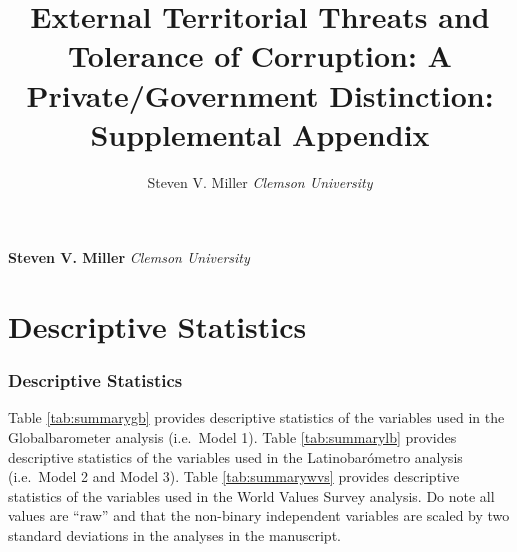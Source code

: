 \documentclass[11pt,]{article}
\title{External Territorial Threats and Tolerance of Corruption: A
Private/Government Distinction: Supplemental Appendix  }
\author{\Large Steven V. Miller\vspace{0.05in} \newline\normalsize\emph{Clemson University}  }
\date{}
\newcommand*{\authorfont}{\fontfamily{phv}\selectfont}
\begin{document}
	
%

{%
\setlength{\parindent}{0pt}
\thispagestyle{plain}
{\fontsize{18}{20}\selectfont\raggedright 
\maketitle  %

}

{
   \vskip 13.5pt\relax \normalsize\fontsize{11}{12} 
\textbf{\authorfont Steven V. Miller} \hskip 15pt \emph{\small Clemson University}   

}

}






\vskip -8.5pt

{
\hypersetup{linkcolor=black}
\setcounter{tocdepth}{2}
\tableofcontents
}

\noindent  \newpage

\section{Descriptive Statistics}\label{descriptive-statistics}

\subsubsection{Descriptive Statistics}\label{descriptive-statistics-1}

Table \ref{tab:summarygb} provides descriptive statistics of the
variables used in the Globalbarometer analysis (i.e.~Model 1). Table
\ref{tab:summarylb} provides descriptive statistics of the variables
used in the Latinobarómetro analysis (i.e.~Model 2 and Model 3). Table
\ref{tab:summarywvs} provides descriptive statistics of the variables
used in the World Values Survey analysis. Do note all values are ``raw''
and that the non-binary independent variables are scaled by two standard
deviations in the analyses in the manuscript.
\end{document}
